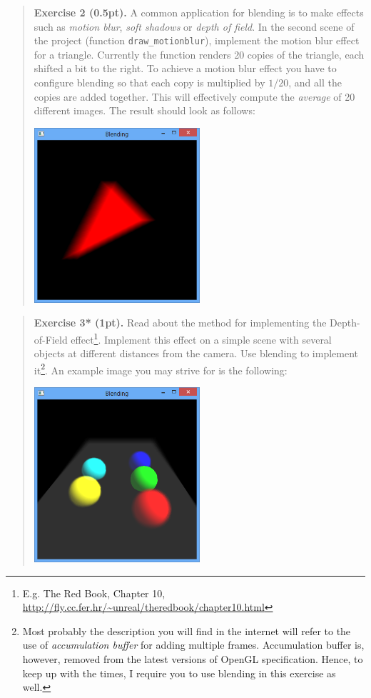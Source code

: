 \documentclass{article}
\newenvironment{exercise}[2]{\begin{verse}\textbf{Exercise #1 (#2pt).} }{
\end{verse}\medskip}
\begin{document}
\begin{exercise}{2}{0.5}
A common application for blending is to make effects such as \emph{motion blur}, \emph{soft shadows} or \emph{depth of field}. In the second scene of the project (function \verb#draw_motionblur#), implement the motion blur effect for a triangle. Currently the function renders 20 copies of the triangle, each shifted a bit to the right. To achieve a motion blur effect you have to configure blending so that each copy is multiplied by $1/20$, and all the copies are added together. This will effectively compute the \emph{average} of 20 different images. The result should look as follows:
\begin{center}
\includegraphics[width=0.5\textwidth]{motionblur.png}
\end{center}
\end{exercise}

\begin{exercise}{3*}{1}
Read about the method for implementing the Depth-of-Field effect\footnote{E.g. The Red Book, Chapter 10, \url{http://fly.cc.fer.hr/~unreal/theredbook/chapter10.html}}. Implement this effect on a simple scene with several objects at different distances from the camera. Use blending to implement it\footnote{Most probably the description you will find in the internet will refer to the use of \emph{accumulation buffer} for adding multiple frames. Accumulation buffer is, however, removed from the latest versions of OpenGL specification. Hence, to keep up with the times, I require you to use blending in this exercise as well.}. An example image you may strive for is the following:
\begin{center}
\includegraphics[width=0.5\textwidth]{dof.png}
\end{center}
\end{exercise}
\end{document}
